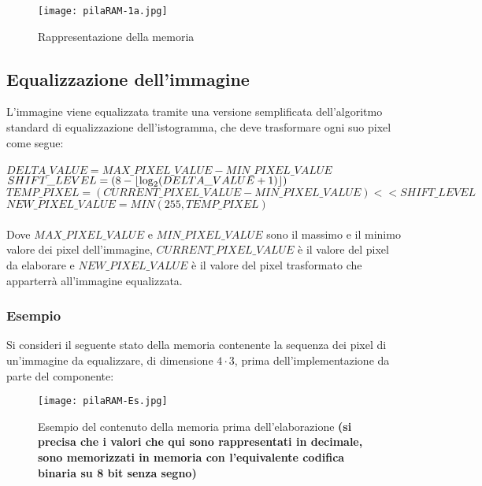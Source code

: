 \documentclass{article}
\DeclarePairedDelimiter\floor{\lfloor}{\rfloor}
\begin{document}
\begin{figure}[H]
	\centering
	\texttt{[image: pilaRAM-1a.jpg]}
	\caption{Rappresentazione della memoria}
\end{figure}

\subsection{Equalizzazione dell'immagine}
L'immagine viene equalizzata tramite una versione semplificata dell'algoritmo standard di equalizzazione dell'istogramma, che deve trasformare ogni suo pixel come segue:\\ \\
$DELTA\_VALUE = MAX\_PIXEL\_VALUE - MIN\_PIXEL\_VALUE$ \\
$SHIFT\_LEVEL = \left(8 - \floor*{\log_{2}(DELTA\_VALUE + 1)}\right)$ \\
$TEMP\_PIXEL = \left(CURRENT\_PIXEL\_VALUE - MIN\_PIXEL\_VALUE\right) << SHIFT\_LEVEL$ \\
$NEW\_PIXEL\_VALUE = MIN\left( 255, TEMP\_PIXEL \right)$ \\ \\
Dove $MAX\_PIXEL\_VALUE$ e $MIN\_PIXEL\_VALUE$ sono il massimo e il minimo valore dei pixel dell'immagine, $CURRENT\_PIXEL\_VALUE$ è il valore del pixel da elaborare e $NEW\_PIXEL\_VALUE$ è il valore del pixel trasformato che apparterrà all'immagine equalizzata.

\subsubsection{Esempio}
Si consideri il seguente stato della memoria contenente la sequenza dei pixel di un'immagine da equalizzare, di dimensione $4\cdot3$, prima dell'implementazione da parte del componente:

\begin{figure}[H]
	\centering
	\texttt{[image: pilaRAM-Es.jpg]}
	\caption{Esempio del contenuto della memoria prima dell'elaborazione \textbf{(si precisa che i valori che qui sono rappresentati in decimale, sono memorizzati in memoria con l'equivalente codifica binaria su 8 bit senza segno)}}
\end{figure}
\end{document}
